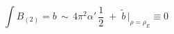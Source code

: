 \begin{equation}
\int B_{(2)} = b \,\sim \, 4 \pi^2 \alpha' \, \frac{1}{2} \;+\; \tilde
b \,|_{\rho = \rho_E} \equiv 0
\end{equation}

